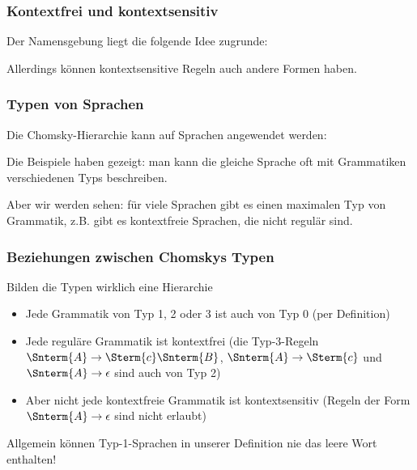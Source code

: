 \documentclass[aspectratio=1610,onlymath]{beamer}
\begin{document}
\begin{frame}\frametitle{Kontextfrei und kontextsensitiv}

Der Namensgebung liegt die folgende Idee zugrunde:\medskip

\medskip

\medskip

Allerdings können kontextsensitive Regeln auch andere Formen haben.

\end{frame}

\begin{frame}\frametitle{Typen von Sprachen}

Die Chomsky-Hierarchie kann auf Sprachen angewendet werden:\medskip

\medskip

Die Beispiele haben gezeigt: man kann die gleiche Sprache oft mit Grammatiken verschiedenen Typs beschreiben.
\medskip

Aber wir werden sehen: für viele Sprachen gibt es einen maximalen Typ von Grammatik, z.B. gibt es kontextfreie Sprachen, die nicht regulär sind.

\end{frame}


\begin{frame}\frametitle{Beziehungen zwischen Chomskys Typen}

Bilden die Typen wirklich eine Hierarchie\\[1ex]

\begin{itemize}
\item Jede Grammatik von Typ 1, 2 oder 3 ist auch von Typ 0 (per Definition)
\item Jede reguläre Grammatik ist kontextfrei
(die Typ-3-Regeln
$\Snterm{A}\to \Sterm{c}\Snterm{B}$, $\Snterm{A}\to \Sterm{c}$ und $\Snterm{A}\to \epsilon$ sind auch von Typ 2)
\item Aber nicht jede kontextfreie Grammatik ist kontextsensitiv
(Regeln der Form $\Snterm{A}\to \epsilon$ sind nicht erlaubt)
\end{itemize}

Allgemein können Typ-1-Sprachen in unserer Definition nie das leere Wort enthalten!

\end{frame}
\end{document}
